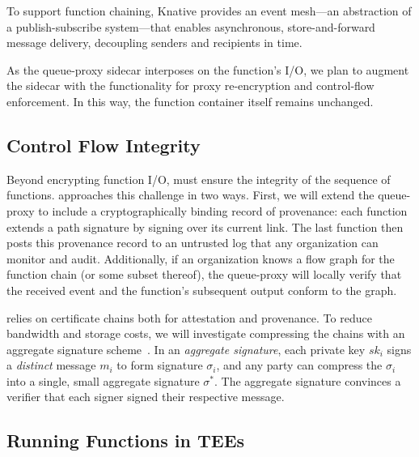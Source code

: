 To support function chaining, Knative provides an event mesh---an abstraction
of a publish-subscribe system---that enables asynchronous, store-and-forward
message delivery, decoupling senders and recipients in time.


%
As the queue-proxy sidecar interposes on the function's I/O, we plan to augment
the sidecar with the functionality for proxy re-encryption and control-flow
enforcement.
%
In this way, the function container itself remains unchanged.




\subsection{Control Flow Integrity}
%
Beyond encrypting function I/O, \SystemName must ensure the integrity
of the sequence of functions.
%
\SystemName approaches this challenge in two ways.
%
First, we will extend the queue-proxy to include a cryptographically binding record
of provenance: each function extends a path signature by signing over its
current link.
%
The last function then posts this provenance record to an untrusted log that
any organization can monitor and audit.
%
Additionally, if an organization knows a flow graph for the function chain (or
some subset thereof),  the queue-proxy will locally verify that the received
event and the function's subsequent output conform to the graph.


\SystemName relies on certificate chains both for attestation and provenance.
%
To reduce bandwidth and storage costs, we will investigate compressing the chains
with an aggregate signature
scheme~\cite{03-eurocrypt-aggregate_signatures_bilinear_maps}.
%
In an \emph{aggregate signature}, each private key $sk_i$ signs a
\emph{distinct} message $m_i$ to form signature $\sigma_i$, and any party can
compress the $\sigma_i$ into a single, small aggregate signature $\sigma^*$.  
%
The aggregate signature convinces a verifier that each signer signed their
respective message.



\subsection{Running Functions in TEEs}

